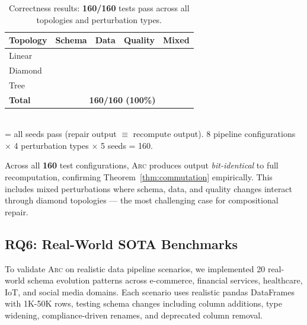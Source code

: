\documentclass[sigplan,screen,nonacm]{acmart}
\newcommand{\cmark}{\ding{51}}
\newcommand{\arc}{\textsc{Arc}\xspace}
\begin{document}
\begin{table}[t]
\caption{Correctness results: \textbf{160/160} tests pass across all topologies
  and perturbation types.}
\label{tab:correctness}
\centering\small
\begin{tabular}{@{}lcccc@{}}
\toprule
\textbf{Topology} & \textbf{Schema} & \textbf{Data} &
  \textbf{Quality} & \textbf{Mixed} \\
\midrule
Linear    & \cmark & \cmark & \cmark & \cmark \\
Diamond   & \cmark & \cmark & \cmark & \cmark \\
Tree      & \cmark & \cmark & \cmark & \cmark \\
\midrule
\textbf{Total} & \multicolumn{4}{c}{\textbf{160/160 (100\%)}} \\
\bottomrule
\end{tabular}\\[4pt]
{\footnotesize \cmark{} = all seeds pass (repair output $\equiv$
recompute output).  8 pipeline configurations $\times$ 4 perturbation types $\times$ 5 seeds = 160.}
\end{table}

Across all \textbf{160} test configurations, \arc produces output \emph{bit-identical}
to full recomputation, confirming Theorem~\ref{thm:commutation}
empirically.  This includes mixed perturbations where schema, data, and
quality changes interact through diamond topologies --- the most
challenging case for compositional repair.

\subsection{RQ6: Real-World SOTA Benchmarks}

To validate \arc on realistic data pipeline scenarios, we implemented 20 
real-world schema evolution patterns across e-commerce, financial services, 
healthcare, IoT, and social media domains. Each scenario uses realistic 
pandas DataFrames with 1K-50K rows, testing schema changes including column 
additions, type widening, compliance-driven renames, and deprecated column 
removal.
\end{document}
